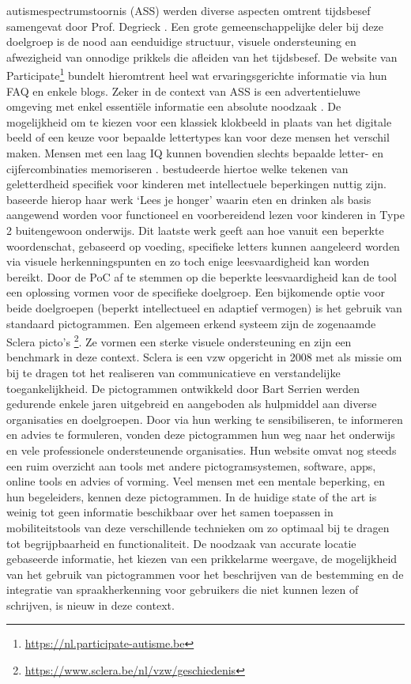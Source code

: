autismespectrumstoornis (ASS) werden diverse aspecten omtrent tijdsbesef samengevat door Prof. Degrieck \autocite{Degrieck2014}. Een grote gemeenschappelijke deler bij deze doelgroep is de nood aan eenduidige structuur, visuele ondersteuning en afwezigheid van onnodige prikkels die afleiden van het tijdsbesef. De website van Participate\footnote{\url{https://nl.participate-autisme.be}} bundelt hieromtrent heel wat ervaringsgerichte informatie via hun FAQ en enkele blogs. Zeker in de context van ASS is een advertentieluwe omgeving met enkel essentiële informatie een absolute noodzaak \autocite{Roeyers2014}. De mogelijkheid om te kiezen voor een klassiek klokbeeld in plaats van het digitale beeld of een keuze voor bepaalde lettertypes kan voor deze mensen het verschil maken. Mensen met een laag IQ kunnen bovendien slechts bepaalde letter- en cijfercombinaties memoriseren \autocite{DeGraaf2001, Tytgat2014}. \textcite{Tilborg2018} bestudeerde hiertoe welke tekenen van geletterdheid specifiek voor kinderen met intellectuele beperkingen nuttig zijn. \textcite{Uyttersprot2021} baseerde hierop haar werk `Lees je honger' waarin eten en drinken als basis aangewend worden voor functioneel en voorbereidend lezen voor kinderen in Type 2 buitengewoon onderwijs. Dit laatste werk geeft aan hoe vanuit een beperkte woordenschat, gebaseerd op voeding, specifieke letters kunnen aangeleerd worden via visuele herkenningspunten en zo toch enige leesvaardigheid kan worden bereikt. Door de PoC af te stemmen op die beperkte leesvaardigheid kan de tool een oplossing vormen voor de specifieke doelgroep. Een bijkomende optie voor beide doelgroepen (beperkt intellectueel en adaptief vermogen) is het gebruik van standaard pictogrammen. Een algemeen erkend systeem zijn de zogenaamde Sclera picto's \footnote{\url{https://www.sclera.be/nl/vzw/geschiedenis}}. Ze vormen een sterke visuele ondersteuning en zijn een benchmark in deze context. Sclera is een vzw opgericht in 2008 met als missie om bij te dragen tot het realiseren van communicatieve en verstandelijke toegankelijkheid. De pictogrammen ontwikkeld door Bart Serrien werden gedurende enkele jaren uitgebreid en aangeboden als hulpmiddel aan diverse organisaties en doelgroepen. Door via hun werking te sensibiliseren, te informeren en advies te formuleren, vonden deze pictogrammen hun weg naar het onderwijs en vele professionele ondersteunende organisaties. Hun website omvat nog steeds een ruim overzicht aan tools met andere pictogramsystemen, software, apps, online tools en advies of vorming. Veel mensen met een mentale beperking, en hun begeleiders, kennen deze pictogrammen. In de huidige state of the art is weinig tot geen informatie beschikbaar over het samen toepassen in mobiliteitstools van deze verschillende technieken om zo optimaal bij te dragen tot begrijpbaarheid en functionaliteit. De noodzaak van accurate locatie gebaseerde informatie, het kiezen van een prikkelarme weergave, de mogelijkheid van het gebruik van pictogrammen voor het beschrijven van de bestemming en de integratie van spraakherkenning voor gebruikers die niet kunnen lezen of schrijven, is nieuw in deze context.


